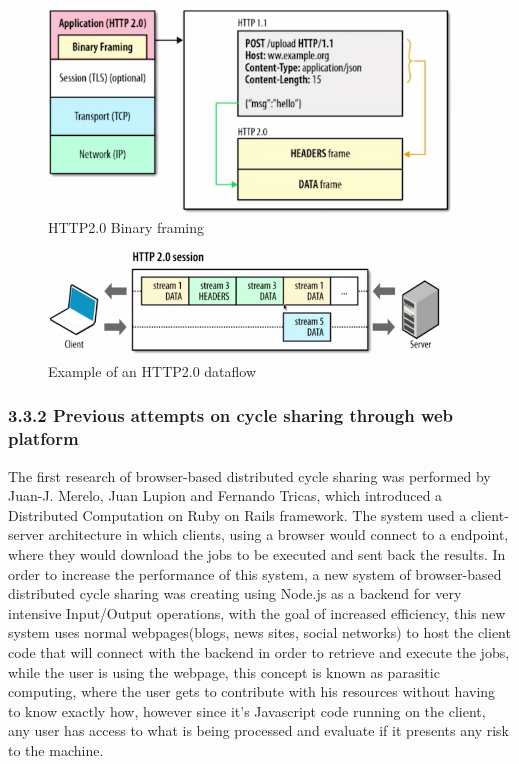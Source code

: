 \documentclass{./llncs2e/llncs}
\begin{document}
\begin{figure}[htbp]
  \centering
  \includegraphics[width=0.95\textwidth]{img/http2binaryframing.png}
  \caption{HTTP2.0 Binary framing}
  \label{fig:binaryframing}
\end{figure}

\begin{figure}[htbp]
  \centering
  \includegraphics[width=0.95\textwidth]{img/http2dataflow.png}
  \caption{Example of an HTTP2.0 dataflow}
  \label{fig:http2dataflow}
\end{figure}


\subsubsection{3.3.2 Previous attempts on cycle sharing through web platform}
The first research of browser-based distributed cycle sharing was performed by Juan-J. Merelo, Juan Lupion and Fernando Tricas, which introduced a Distributed Computation on Ruby on Rails framework\cite{Merelo2007}. The system used a client-server architecture in which clients, using a browser would connect to a endpoint, where they would download the jobs to be executed and sent back the results. In order to increase the performance of this system, a new system\cite{Duda2013} of browser-based distributed cycle sharing was creating using Node.js as a backend for very intensive Input/Output operations\cite{Tilkov2010}, with the goal of increased efficiency, this new system uses normal webpages(blogs, news sites, social networks) to host the client code that will connect with the backend in order to retrieve and execute the jobs, while the user is using the webpage, this concept is known as parasitic computing\cite{Barabasi2001}, where the user gets to contribute with his resources without having to know exactly how, however since it's Javascript code running on the client, any user has access to what is being processed and evaluate if it presents any risk to the machine.
\end{document}
